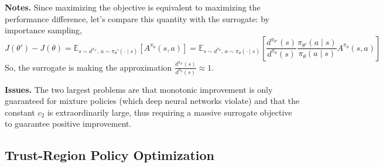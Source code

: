 \documentclass[11pt, letterpaper]{article}
\begin{document}
\begin{remark}
    \textbf{Notes.} Since maximizing the objective is equivalent to maximizing the performance difference, let's compare this quantity with the surrogate: by importance sampling, 
    \[
        J(\theta') - J(\theta)
        = \mathbb{E}_{s \sim d^{\pi_{\theta'}},\, a \sim \pi_\theta'(\cdot \mid s)} \left[ A^{\pi_\theta}(s, a) \right]
        = \mathbb{E}_{s \sim d^{\pi_\theta},\, a \sim \pi_\theta(\cdot \mid s)} \left[ \frac{d^{\pi_{\theta'}}(s)}{d^{\pi_\theta}(s)} \frac{\pi_{\theta'}(a \mid s)}{\pi_\theta(a \mid s)} A^{\pi_\theta}(s, a) \right]
    \]
    So, the surrogate is making the approximation \(\frac{d^{\pi_{\theta'}}(s)}{d^{\pi_\theta}(s)} \approx 1\). 

    \textbf{Issues.} The two largest problems are that monotonic improvement is only guaranteed for mixture policies (which deep neural networks violate) and that the constant \(c_2\) is extraordinarily large, thus requiring a massive surrogate objective to guarantee positive improvement. 
\end{remark}

\subsection{Trust-Region Policy Optimization}
\end{document}
